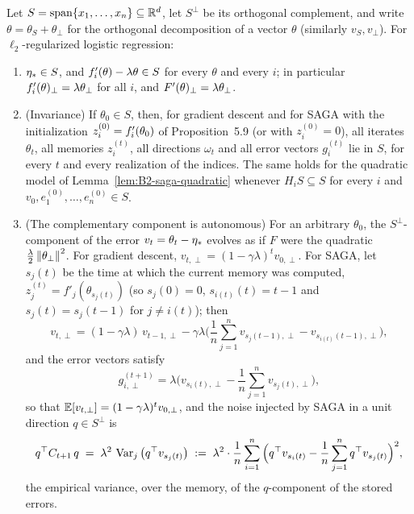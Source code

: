 \begin{lemma}\label{lem:B2-span}
Let $S=\operatorname{span}\{x_1,\dots,x_n\}\subseteq\mathbb{R}^d$, let $S^\perp$ be its orthogonal complement, and write
$\theta=\theta_S+\theta_\perp$ for the orthogonal decomposition of a vector $\theta$ (similarly $v_S,v_\perp$).
For $\ell_2$-regularized logistic regression:
\begin{enumerate}[label=(\alph*)]
\item $\eta_\ast\in S$, and $f'_i(\theta)-\lambda\theta\in S$ for every $\theta$ and every $i$; in particular
$f'_i(\theta)_\perp=\lambda\theta_\perp$ for all $i$, and $F'(\theta)_\perp=\lambda\theta_\perp$.
\item (Invariance) If $\theta_0\in S$, then, for gradient descent and for SAGA with the initialization
$z_i^{(0)}=f'_i(\theta_0)$ of Proposition~5.9 (or with $z_i^{(0)}=0$), all iterates $\theta_t$, all memories $z_i^{(t)}$,
all directions $\omega_t$ and all error vectors $g_i^{(t)}$ lie in $S$, for every $t$ and every realization of the
indices. The same holds for the quadratic model of Lemma~\ref{lem:B2-saga-quadratic} whenever $H_iS\subseteq S$ for
every $i$ and $v_0,e_1^{(0)},\dots,e_n^{(0)}\in S$.
\item (The complementary component is autonomous) For an arbitrary $\theta_0$, the $S^\perp$-component of the
error $v_t=\theta_t-\eta_\ast$ evolves as if $F$ were the quadratic $\frac\lambda2\left\|\theta_\perp\right\|^2$. For gradient
descent, $v_{t,\perp}=(1-\gamma\lambda)^tv_{0,\perp}$. For SAGA, let $s_j(t)$ be the time at which the current memory was
computed, $z_j^{(t)}=f'_j(\theta_{s_j(t)})$ (so $s_j(0)=0$, $s_{i(t)}(t)=t-1$ and $s_j(t)=s_j(t-1)$ for $j\neq i(t)$); then
\[
v_{t,\perp}=(1-\gamma\lambda)\,v_{t-1,\perp}-\gamma\lambda\Big(\frac1n\sum_{j=1}^nv_{s_j(t-1),\perp}-v_{s_{i(t)}(t-1),\perp}\Big),
\]
and the error vectors satisfy
\[
g^{(t+1)}_{i,\perp}=\lambda\Big(v_{s_i(t),\perp}-\frac1n\sum_{j=1}^nv_{s_j(t),\perp}\Big),
\]
so that $\mathbb{E}[v_{t,\perp}]=(1-\gamma\lambda)^tv_{0,\perp}$, and the noise injected by SAGA in a unit direction $q\in S^\perp$ is
\[
q^\top C_{t+1}\,q\;=\;\lambda^2\,\operatorname{Var}_j\big(q^\top v_{s_j(t)}\big)
\;:=\;\lambda^2\cdot\frac1n\sum_{i=1}^n\Big(q^\top v_{s_i(t)}-\frac1n\sum_{j=1}^nq^\top v_{s_j(t)}\Big)^2 ,
\]
the empirical variance, over the memory, of the $q$-component of the stored errors.
\end{enumerate}
\end{lemma}

